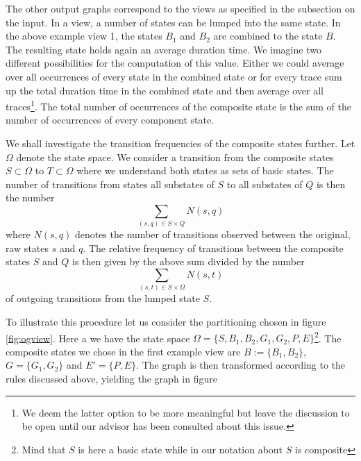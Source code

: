 \documentclass[12pt]{extarticle}
\begin{document}
The other output graphs correspond to the views as specified in the subsection on the input. In a view, a number of states can be lumped into the same state. In the above example view 1, the states $B_1$ and $B_2$ are combined to the state $B$. The resulting state holds again an average duration time. We imagine two different possibilities for the computation of this value. Either we could average over all occurrences of every state in the combined state or for every trace sum up the total duration time in the combined state and then average over all traces\footnote{We deem the latter option to be more meaningful but leave the discussion to be open until our advisor has been consulted about this issue.}. The total number of occurrences of the composite state is the sum of the number of occurrences of every component state. 



We shall investigate the transition frequencies of the composite states further. Let $\Omega$ denote the state space. We consider a transition from the composite states $S \subset \Omega$ to $T \subset \Omega$ where we understand both states as sets of basic states. The number of transitions from states all substates of $S$ to all substates of $Q$ is then the number
\[ 
    \sum_{(s,q) \in S \times Q} N(s,q)
\]
where $N(s,q)$ denotes the number of transitions observed between the original, raw states $s$ and $q$. The relative frequency of transitions between the composite states $S$ and $Q$ is then given by the above sum divided by the number
\[
    \sum_{(s,t) \in S \times \Omega} N(s,t)
\]
of outgoing transitions from the lumped state $S$.

To illustrate this procedure let us consider the partitioning chosen in figure \ref{fig:ogview}. Here a we have the state space $\Omega = \{ S, B_1, B_2, G_1, G_2, P, E \}$\footnote{Mind that $S$ is here a basic state while in our notation about $S$ is composite}. The composite states we chose in the first example view are $B := \{ B_1, B_2 \} $, $G = \{ G_1, G_2 \}$ and $E' = \{ P, E \}$. The graph is then transformed according to the rules discussed above, yielding the graph in figure \
\end{document}
